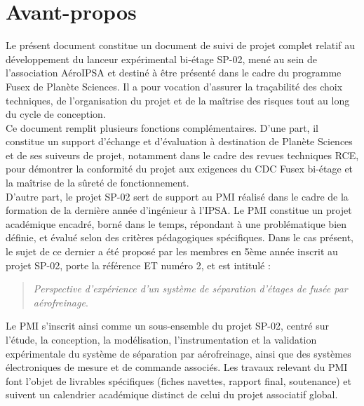 \section*{Avant-propos}
\label{sec:avant_propos}

Le présent document constitue un document de suivi de projet complet relatif au développement du lanceur expérimental bi-étage
SP-02, mené au sein de l'association AéroIPSA et destiné à être présenté dans le cadre du programme \gls{Fusex} de
\gls{Planète Sciences}. Il a pour vocation d'assurer la traçabilité des choix techniques, de l'organisation du projet et de la
maîtrise des risques tout au long du cycle de conception.\\

Ce document remplit plusieurs fonctions complémentaires. D'une part, il constitue un support d'échange et d'évaluation à
destination de \gls{Planète Sciences} et de ses suiveurs de projet, notamment dans le cadre des revues techniques \acrfull{RCE},
pour démontrer la conformité du projet aux exigences du \acrfull{CDC} \gls{Fusex} bi-étage et la maîtrise de la sûreté de
fonctionnement.\\

D'autre part, le projet SP-02 sert de support au \acrfull{PMI} réalisé dans le cadre de la formation de la dernière année
d'ingénieur à l'\acrfull{IPSA}. Le \acrshort{PMI} constitue un projet académique encadré, borné dans le temps, répondant à une
problématique bien définie, et évalué selon des critères pédagogiques spécifiques. Dans le cas présent, le sujet de ce dernier
a été proposé par les membres en 5ème année inscrit au projet SP-02, porte la référence \og{}\acrfull{ET} numéro 2\fg{}, et est
intitulé :

\begin{quote}
\textit{\og{}Perspective d'expérience d'un système de séparation d'étages de fusée par aérofreinage\fg{}}.
\end{quote}

Le \acrshort{PMI} s'inscrit ainsi comme un sous-ensemble du projet SP-02, centré sur l'étude, la conception, la modélisation,
l'instrumentation et la validation expérimentale du système de séparation par aérofreinage, ainsi que des systèmes
électroniques de mesure et de commande associés. Les travaux relevant du \acrshort{PMI} font l'objet de livrables spécifiques
(fiches navettes, rapport final, soutenance) et suivent un calendrier académique distinct de celui du projet associatif global.\\

